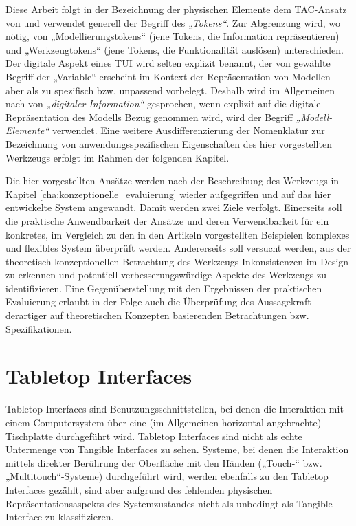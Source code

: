 Diese Arbeit folgt in der Bezeichnung der physischen Elemente dem TAC-Ansatz von \citep{Shaer04} und verwendet generell der Begriff des \emph{„Tokens“}. Zur Abgrenzung wird, wo nötig, von „Modellierungstokens“ (jene Tokens, die Information repräsentieren) und „Werkzeugtokens“ (jene Tokens, die Funktionalität auslösen) unterschieden. Der digitale Aspekt eines \gls{TUI} wird selten explizit benannt, der von \citep{Shaer04} gewählte Begriff der „Variable“ erscheint im Kontext der Repräsentation von Modellen aber als zu spezifisch bzw. unpassend vorbelegt. Deshalb wird im Allgemeinen nach \citep{Ishii08} von \emph{„digitaler Information“} gesprochen, wenn explizit auf die digitale Repräsentation des Modells Bezug genommen wird, wird der Begriff \emph{„Modell-Elemente“} verwendet. Eine weitere Ausdifferenzierung der Nomenklatur zur Bezeichnung von anwendungsspezifischen Eigenschaften des hier vorgestellten Werkzeugs erfolgt im Rahmen der folgenden Kapitel.

Die hier vorgestellten Ansätze werden nach der Beschreibung des Werkzeugs in Kapitel \ref{cha:konzeptionelle_evaluierung} wieder aufgegriffen und auf das hier entwickelte System angewandt. Damit werden zwei Ziele verfolgt. Einerseits soll die praktische Anwendbarkeit der Ansätze und deren Verwendbarkeit für ein konkretes, im Vergleich zu den in den Artikeln vorgestellten Beispielen komplexes und flexibles System überprüft werden. Andererseits soll versucht werden, aus der theoretisch-konzeptionellen Betrachtung des Werkzeugs Inkonsistenzen im Design zu erkennen und potentiell verbesserungswürdige Aspekte des Werkzeugs zu identifizieren. Eine Gegenüberstellung mit den Ergebnissen der praktischen Evaluierung erlaubt in der Folge auch die Überprüfung des Aussagekraft derartiger auf theoretischen Konzepten basierenden Betrachtungen bzw. Spezifikationen.



\section{Tabletop Interfaces} %
\label{sec:tabletop_interfaces}

Tabletop Interfaces sind Benutzungsschnittstellen, bei denen die Interaktion mit einem Computersystem über eine (im Allgemeinen horizontal angebrachte) Tischplatte durchgeführt wird. Tabletop Interfaces sind nicht als echte Untermenge von Tangible Interfaces zu sehen. Systeme, bei denen die Interaktion mittels direkter Berührung der Oberfläche mit den Händen („Touch-“ bzw. „Multitouch“-Systeme) durchgeführt wird, werden ebenfalls zu den Tabletop Interfaces gezählt, sind aber aufgrund des fehlenden physischen Repräsentationsaspekts des Systemzustandes nicht als unbedingt als Tangible Interface zu klassifizieren.

